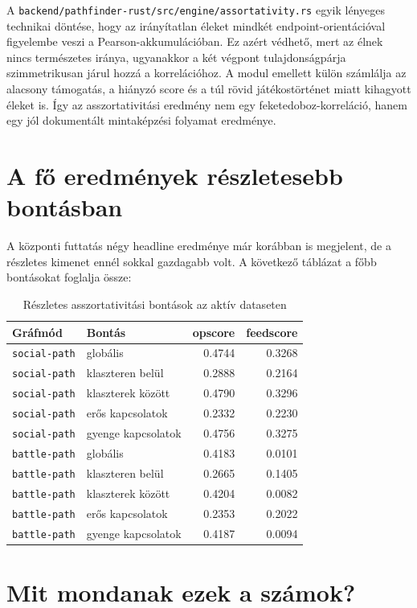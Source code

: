 \documentclass[a4paper,12pt]{report}
\begin{document}
A \texttt{backend/pathfinder-rust/src/engine/assortativity.rs} egyik lényeges technikai döntése, hogy az irányítatlan éleket mindkét endpoint-orientációval figyelembe veszi a Pearson-akkumulációban. Ez azért védhető, mert az élnek nincs természetes iránya, ugyanakkor a két végpont tulajdonságpárja szimmetrikusan járul hozzá a korrelációhoz. A modul emellett külön számlálja az alacsony támogatás, a hiányzó score és a túl rövid játékostörténet miatt kihagyott éleket is. Így az asszortativitási eredmény nem egy feketedoboz-korreláció, hanem egy jól dokumentált mintaképzési folyamat eredménye.

\section{A fő eredmények részletesebb bontásban}

A központi futtatás négy headline eredménye már korábban is megjelent, de a részletes kimenet ennél sokkal gazdagabb volt. A következő táblázat a főbb bontásokat foglalja össze:

\begin{table}[H]
\centering
\caption{Részletes asszortativitási bontások az aktív dataseten}
\begin{tabular}{llrr}
\toprule
\textbf{Gráfmód} & \textbf{Bontás} & \textbf{opscore} & \textbf{feedscore} \\
\midrule
\texttt{social-path} & globális & 0.4744 & 0.3268 \\
\texttt{social-path} & klaszteren belül & 0.2888 & 0.2164 \\
\texttt{social-path} & klaszterek között & 0.4790 & 0.3296 \\
\texttt{social-path} & erős kapcsolatok & 0.2332 & 0.2230 \\
\texttt{social-path} & gyenge kapcsolatok & 0.4756 & 0.3275 \\
\texttt{battle-path} & globális & 0.4183 & 0.0101 \\
\texttt{battle-path} & klaszteren belül & 0.2665 & 0.1405 \\
\texttt{battle-path} & klaszterek között & 0.4204 & 0.0082 \\
\texttt{battle-path} & erős kapcsolatok & 0.2353 & 0.2022 \\
\texttt{battle-path} & gyenge kapcsolatok & 0.4187 & 0.0094 \\
\bottomrule
\end{tabular}
\end{table}

\section{Mit mondanak ezek a számok?}
\end{document}
